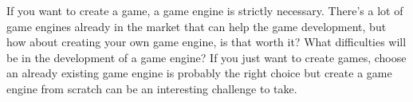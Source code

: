 If you want to create a game, a game engine is strictly necessary. There's a lot of game engines already in the market that can help the game development, but how about creating your own game engine, is that worth it? What difficulties will be in the development of a game engine? If you just want to create games, choose an already existing game engine is probably the right choice but create a game engine from scratch can be an interesting challenge to take. 